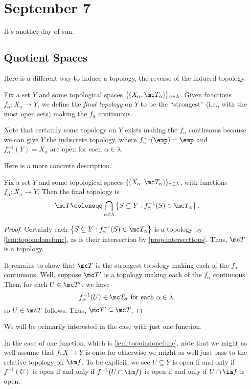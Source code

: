 \documentclass[../notes.tex]{subfiles}
\begin{document}
\section{September 7}

It's another day of sun.

\subsection{Quotient Spaces}
Here is a different way to induce a topology, the reverse of the induced topology.
\begin{definition}
	Fix a set $Y$ and some topological spaces $\{(X_\alpha,\mc T_\alpha)\}_{\alpha\in\lambda}$. Given functions $f_\alpha\colon X_\alpha\to Y$, we define the \textit{final topology} on $Y$ to be the ``strongest'' (i.e., with the most open sets) making the $f_\alpha$ continuous.
\end{definition}
\begin{remark}
	Note that certainly some topology on $Y$ exists making the $f_\alpha$ continuous because we can give $Y$ the indiscrete topology, where $f_\alpha^{-1}(\emp)=\emp$ and $f_\alpha^{-1}(Y)=X_\alpha$ are open for each $\alpha\in\lambda$.
\end{remark}
Here is a more concrete description.
\begin{lemma}
	Fix a set $Y$ and some topological spaces $\{(X_\alpha,\mc T_\alpha)\}_{\alpha\in\lambda}$, with functions $f_\alpha\colon X_\alpha\to Y$. Then the final topology is
	\[\mc T\coloneqq\bigcap_{\alpha\in\lambda}\left\{S\subseteq Y:f^{-1}_\alpha(S)\in\mc T_\alpha\right\}.\]
\end{lemma}
\begin{proof}
	Certainly each $\left\{S\subseteq Y:f^{-1}_\alpha(S)\in\mc T_\alpha\right\}$ is a topology by \autoref{lem:topoindonefunc}, as is their intersection by \autoref{prop:intersecttops}. Thus, $\mc T$ is a topology.
	
	It remains to show that $\mc T$ is the strongest topology making each of the $f_\alpha$ continuous. Well, suppose $\mc T'$ is a topology making each of the $f_\alpha$ continuous. Then, for each $U\in\mc T'$, we have
	\[f_\alpha^{-1}(U)\in\mc T_\alpha\text{ for each }\alpha\in\lambda,\]
	so $U\in\mc T$ follows. Thus, $\mc T'\subseteq\mc T$.
\end{proof}
We will be primarily interested in the case with just one function.
\begin{remark}
	In the case of one function, which is \autoref{lem:topoindonefunc}, note that we might as well assume that $f\colon X\to Y$ is onto for otherwise we might as well just pass to the relative topology on $\im f$. To be explicit, we see $U\subseteq Y$ is open if and only if $f^{-1}(U)$ is open if and only if $f^{-1}(U\cap\im f)$ is open if and only if $U\cap\im f$ is open.
\end{remark}
\end{document}
